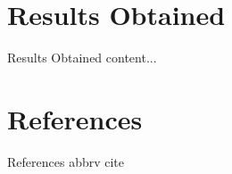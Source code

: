 \documentclass{beamer}
\begin{document}
\section{Results Obtained}
\begin{frame}{Results Obtained}
	content...
\end{frame}
\section{References}
\begin{frame}[allowframebreaks]{References}
	 {abbrv}
	 {cite}
\end{frame}
\end{document}
